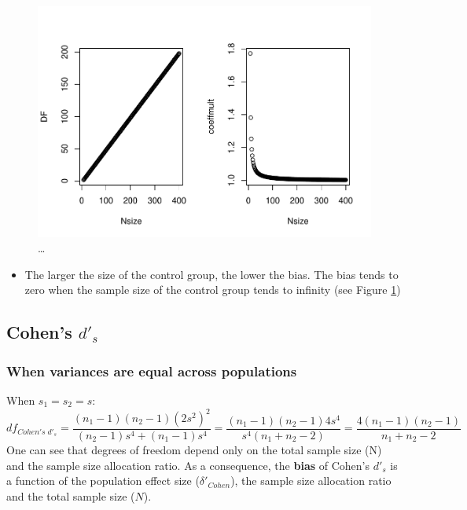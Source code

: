 \documentclass[
  man]{apa6}
\providecommand{\tightlist}{%
  \setlength{\itemsep}{0pt}\setlength{\parskip}{0pt}}
\begin{document}
\begin{figure}
\centering
\includegraphics{Theoretical-Bias-and-variance,-as-a-function-of-population-parameters_files/figure-latex/biasGlassctrlsize2-1.pdf}
\caption{\label{fig:biasGlassctrlsize2}\ldots{}}
\end{figure}

\begin{itemize}
\tightlist
\item
  The larger the size of the control group, the lower the bias. The bias tends to zero when the sample size of the control group tends to infinity (see Figure \ref{fig:biasGlassctrlsize2})
\end{itemize}

\hypertarget{cohens-d_s-1}{%
\subsection{\texorpdfstring{Cohen's \(d'_s\)}{Cohen's d'\_s}}\label{cohens-d_s-1}}

\hypertarget{when-variances-are-equal-across-populations-1}{%
\subsubsection{When variances are equal across populations}\label{when-variances-are-equal-across-populations-1}}

When \(s_1=s_2=s\):
\[df_{Cohen's \; d'_s} = \frac{(n_1-1)(n_2-1)(2s^2)^2}{(n_2-1)s^4+(n_1-1)s^4} = \frac{(n_1-1)(n_2-1)4s^4}{s^4(n_1+n_2-2)} = \frac{4(n_1-1)(n_2-1)}{n_1+n_2-2}\]
One can see that degrees of freedom depend only on the total sample size (N) and the sample size allocation ratio. As a consequence, the \textbf{bias} of Cohen's \(d'_s\) is a function of the population effect size (\(\delta'_{Cohen}\)), the sample size allocation ratio and the total sample size (\(N\)).
\end{document}
